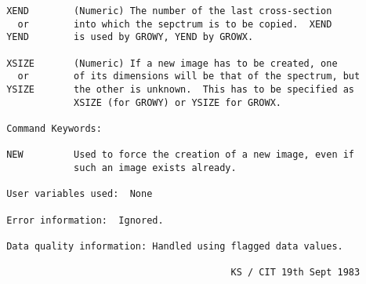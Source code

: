 \begin{description}
\begin{verbatim}
 XEND        (Numeric) The number of the last cross-section
   or        into which the sepctrum is to be copied.  XEND
 YEND        is used by GROWY, YEND by GROWX.

 XSIZE       (Numeric) If a new image has to be created, one
   or        of its dimensions will be that of the spectrum, but
 YSIZE       the other is unknown.  This has to be specified as
             XSIZE (for GROWY) or YSIZE for GROWX.

 Command Keywords:

 NEW         Used to force the creation of a new image, even if
             such an image exists already.

 User variables used:  None

 Error information:  Ignored.

 Data quality information: Handled using flagged data values.

                                         KS / CIT 19th Sept 1983
\end{verbatim}
\end{description}
